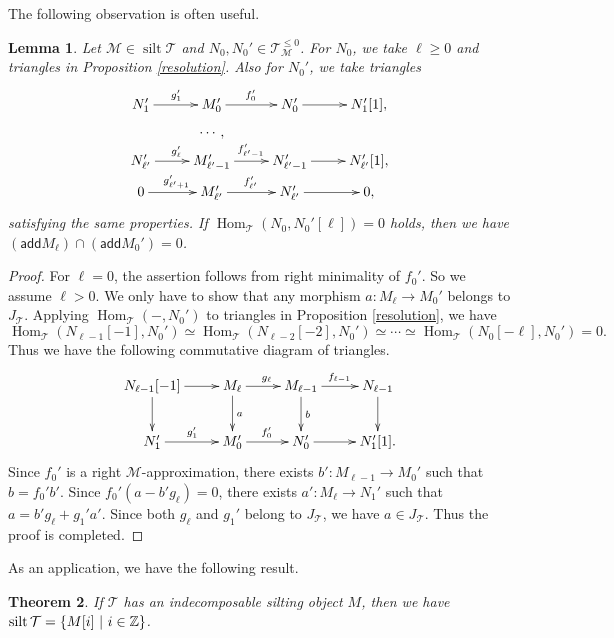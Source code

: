 \documentclass[a4paper,reqno]{amsart}
\newtheorem{theorem}{Theorem}[section]
\newtheorem{lemma}[theorem]{Lemma}
\theoremstyle{definition}
\newcommand{\TT}{{\mathcal T}}
\newcommand{\MM}{{\mathcal M}}
\newcommand{\add}{\mathsf{add}}
\newcommand{\Hom}{\operatorname{Hom}\nolimits}
\newcommand{\silt}{\operatorname{silt}\nolimits}
\begin{document}
The following observation is often useful.

\begin{lemma}\label{no common summand}
Let $\MM\in\silt\TT$ and $N_0,N_0'\in\TT_{\MM}^{\le0}$.
For $N_0$, we take $\ell\ge0$ and triangles in Proposition \ref{resolution}.
Also for $N_0'$, we take triangles 
\[\xymatrix@R=0.2cm{
N_1'\ar[r]^{g_1'}&M_0'\ar[r]^{f_0'}&N_0'\ar[r]&N_1'[1],\\
&\cdots,\\
N_{\ell'}'\ar[r]^{g_\ell'}&M_{\ell'-1}'\ar[r]^{f_{\ell'-1}'}&N_{\ell'-1}'\ar[r]&N_{\ell'}'[1],\\
0\ar[r]^{g_{\ell'+1}'}&M_{\ell'}'\ar[r]^{f_{\ell'}'}&N_{\ell'}'\ar[r]&0,
}\]
satisfying the same properties.
If $\Hom_{\TT}(N_0,N_0'[\ell])=0$ holds, then we have $(\add M_\ell)\cap(\add M_0')=0$.
\end{lemma}

\begin{proof}
For $\ell=0$, the assertion follows from right minimality of $f_0'$. So we assume $\ell>0$.
We only have to show that any morphism $a:M_\ell\to M_0'$ belongs
to $J_{\TT}$. Applying $\Hom_{\TT}(-,N_0')$ to triangles in Proposition \ref{resolution}, we have
\[\Hom_{\TT}(N_{\ell-1}[-1],N_0')\simeq\Hom_{\TT}(N_{\ell-2}[-2],N_0')
\simeq\cdots\simeq\Hom_{\TT}(N_0[-\ell],N_0')=0.\]
Thus we have the following commutative diagram of triangles.
\[\xymatrix{
N_{\ell-1}[-1] \ar[r] \ar[d] & M_\ell \ar[r]^{g_{\ell}} \ar[d]^{a} & M_{\ell-1} \ar[r]^{f_{\ell-1}} \ar[d]^{b} & N_{\ell-1}\ar[d] \\
N_1' \ar[r]^{g_{1}'} & M_0' \ar[r]^{f_{0}'} & N_0'\ar[r]&N_1'[1].
}\]
Since $f_0'$ is a right $\MM$-approximation,
there exists $b':M_{\ell-1}\to M_0'$ such that $b=f_0'b'$.
Since $f_0'(a-b'g_\ell)=0$, there exists $a':M_\ell\to N_1'$
such that $a=b'g_\ell+g_1'a'$. Since both $g_\ell$ and $g_1'$ belong to $J_{\TT}$,
we have $a\in J_{\TT}$.
Thus the proof is completed.
\end{proof}

As an application, we have the following result.

\begin{theorem}\label{indecomposable case}
If $\TT$ has an indecomposable silting object $M$, 
then we have $\silt{\TT}=\{M[i]\ |\ i\in \Bbb{Z}\}$.  
\end{theorem}
\end{document}
